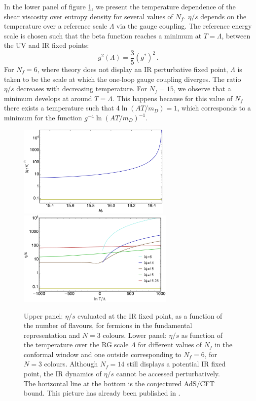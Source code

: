 In the lower panel of figure \ref{etas_Nf}, we present the temperature dependence of the shear viscosity over entropy 
density for several values of $N_f$. $\eta/s$ depends on the temperature over a reference scale $\Lambda$ via the 
gauge coupling. The reference energy scale is chosen such that the beta function reaches a minimum at $T=\Lambda$,
between the UV and IR fixed points:
\begin{equation}
g^2(\Lambda)=\frac{3}{5}(g^*)^2 \, .
\label{Lambda_visc}
\end{equation} 
%
For $N_f = 6$, where theory does not display an IR perturbative fixed point, $\Lambda$ is taken to be the scale at 
which the one-loop gauge coupling diverges. The ratio $\eta/s$ decreases with decreasing temperature. For $N_f=15$, we observe that a minimum develops at around $T = \Lambda$.  This happens  because for this value of $N_f$ there exists a temperature such that $4 \ln \left(AT/m_D \right)  = 1 $, which corresponds to a minimum for the function $g^{-4} \ln \left(AT/m_D \right)  ^{-1} $. 

\begin{figure}[b!]
\begin{center}
\includegraphics[width=0.665\textwidth]{pics/eta-s-n3} \\
\includegraphics[width=0.68\textwidth]{pics/Temperature-etaovers-n3}
\end{center}
\caption{Upper panel: ${\eta}/{s}$ evaluated at the IR fixed point, as a function of the number of flavours, for fermions in 
the fundamental representation and $N = 3$ colours. Lower panel:  ${\eta}/{s}$ as function of the temperature over the 
RG scale $\Lambda$  for different values of $N_f$ in the conformal window and one outside corresponding to $N_f = 6$, for $N=3$ colours. Although $N_f = 14$ still displays a potential IR fixed point, the IR dynamics  of ${\eta}/{s}$ cannot be accessed perturbatively.  
The horizontal line at the bottom is the conjectured AdS/CFT bound. This picture has already been published in \cite{Toniato:2016twr}.} 
\label{etas_Nf}
\end{figure}


